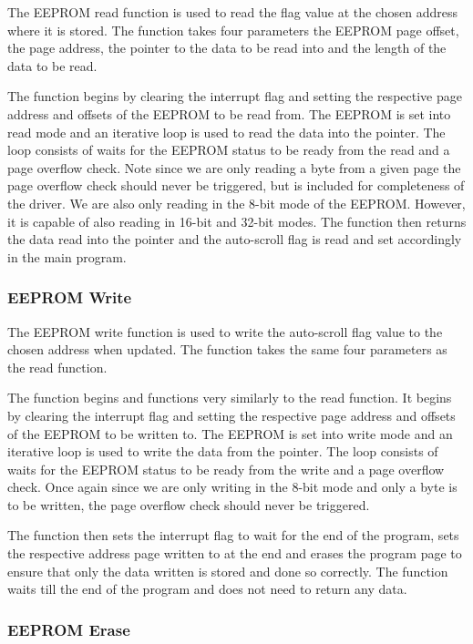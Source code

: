 \documentclass{cce2014-design}
\begin{document}
The EEPROM read function is used to read the flag value at the chosen address where it is stored.
The function takes four parameters the EEPROM page offset, the page address, the pointer to the data to be read into and the length of the data to be read.

The function begins by clearing the interrupt flag and setting the respective page address and offsets of the EEPROM to be read from.
The EEPROM is set into read mode and an iterative loop is used to read the data into the pointer.
The loop consists of waits for the EEPROM status to be ready from the read and a page overflow check.
Note since we are only reading a byte from a given page the page overflow check should never be triggered, but is included for completeness of the driver.
We are also only reading in the 8-bit mode of the EEPROM.
However, it is capable of also reading in 16-bit and 32-bit modes.
The function then returns the data read into the pointer and the auto-scroll flag is read and set accordingly in the main program.

\subsubsection{EEPROM Write}

The EEPROM write function is used to write the auto-scroll flag value to the chosen address when updated.
The function takes the same four parameters as the read function.

The function begins and functions very similarly to the read function.
It begins by clearing the interrupt flag and setting the respective page address and offsets of the EEPROM to be written to.
The EEPROM is set into write mode and an iterative loop is used to write the data from the pointer.
The loop consists of waits for the EEPROM status to be ready from the write and a page overflow check.
Once again since we are only writing in the 8-bit mode and only a byte is to be written, the page overflow check should never be triggered.

The function then sets the interrupt flag to wait for the end of the program, sets the respective address page written to at the end and erases the program page to ensure that only the data written is stored and done so correctly.
The function waits till the end of the program and does not need to return any data.

\subsubsection{EEPROM Erase}
\end{document}
